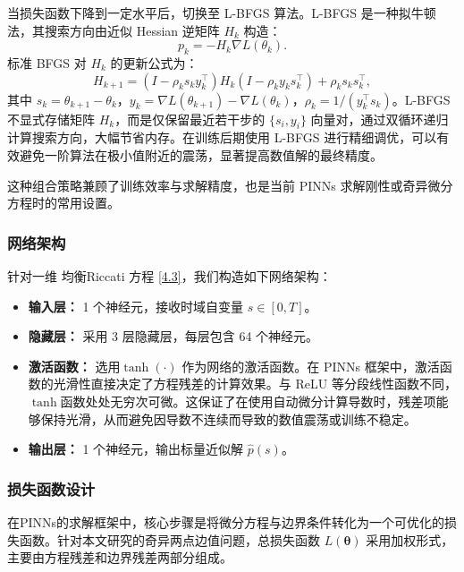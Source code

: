 \documentclass{GZUbachelorthesis}
\begin{document}
当损失函数下降到一定水平后，切换至 L-BFGS 算法。L-BFGS 是一种拟牛顿法，其搜索方向由近似 Hessian 逆矩阵 $H_k$ 构造：
\begin{equation}
	p_k = -H_k \nabla L(\theta_k).
\end{equation}
标准 BFGS 对 $H_k$ 的更新公式为：
\begin{equation}
	H_{k+1} = \left(I - \rho_k s_k y_k^\top\right) H_k \left(I - \rho_k y_k s_k^\top\right) + \rho_k s_k s_k^\top,
\end{equation}
其中 $s_k = \theta_{k+1} - \theta_k$，$y_k = \nabla L(\theta_{k+1}) - \nabla L(\theta_k)$，$\rho_k = 1/(y_k^\top s_k)$。L-BFGS 不显式存储矩阵 $H_k$，而是仅保留最近若干步的 $\{s_i, y_i\}$ 向量对，通过双循环递归计算搜索方向，大幅节省内存。在训练后期使用 L-BFGS 进行精细调优，可以有效避免一阶算法在极小值附近的震荡，显著提高数值解的最终精度。

这种组合策略兼顾了训练效率与求解精度，也是当前 PINNs 求解刚性或奇异微分方程时的常用设置。

\subsubsection{网络架构}
针对一维 均衡Riccati 方程 \eqref{4.3}，我们构造如下网络架构：
\begin{itemize}
	\item \textbf{输入层：} 1 个神经元，接收时域自变量 
	 $s \in [0, T]$。
	\item \textbf{隐藏层：} 采用 3 层隐藏层，每层包含 64 个神经元。
	\item \textbf{激活函数：} 选用$\tanh(\cdot)$ 作为网络的激活函数。在 PINNs 框架中，激活函数的光滑性直接决定了方程残差的计算效果。与 ReLU 等分段线性函数不同，$\tanh$函数处处无穷次可微。这保证了在使用自动微分计算导数时，残差项能够保持光滑，从而避免因导数不连续而导致的数值震荡或训练不稳定。
	\item \textbf{输出层：} 1 个神经元，输出标量近似解 $\hat{p}(s)$。
\end{itemize}

\subsubsection{损失函数设计}

在PINNs的求解框架中，核心步骤是将微分方程与边界条件转化为一个可优化的损失函数。针对本文研究的奇异两点边值问题，总损失函数 $L(\boldsymbol{\theta})$ 采用加权形式，主要由方程残差和边界残差两部分组成。
\end{document}
